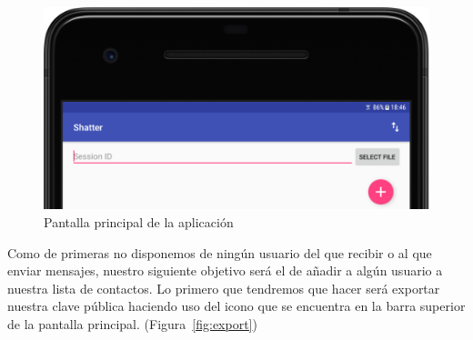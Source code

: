\begin{figure}[ht]
  \centering
  \includegraphics[scale=0.4]{Figures/home}
  \decoRule
  \caption[Shatter (Home)]{Pantalla principal de la aplicación}
  \label{fig:home}
\end{figure}

Como de primeras no disponemos de ningún usuario del que recibir o al que
enviar mensajes, nuestro siguiente objetivo será el de añadir a algún usuario a
nuestra lista de contactos. Lo primero que tendremos que hacer será exportar
nuestra clave pública haciendo uso del icono que se encuentra en la barra
superior de la pantalla principal. (Figura~\ref{fig:export})

